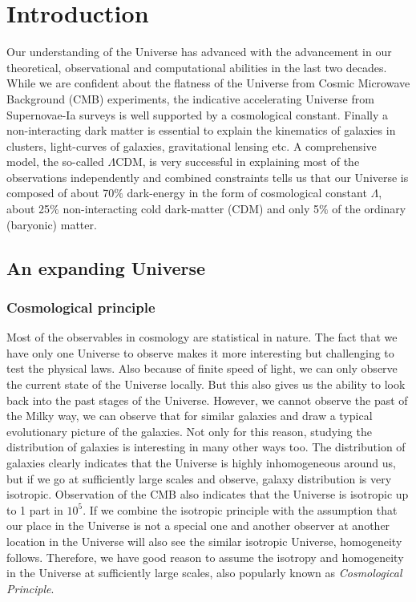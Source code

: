 \chapter{Introduction}\label{Introduction}

Our understanding of the Universe has advanced with the advancement in our 
theoretical, observational and computational abilities in the last two decades. 
While we are confident about the flatness of the Universe from Cosmic Microwave 
Background (CMB) experiments, 
the indicative accelerating Universe from Supernovae-Ia surveys is well supported
by a cosmological constant. Finally a non-interacting dark matter is essential 
to explain the kinematics of galaxies in clusters, light-curves of galaxies, 
gravitational lensing etc. A comprehensive model, the so-called $\Lambda$CDM,
is very successful in explaining most of the observations independently and 
combined constraints tells us that our Universe is composed of about 70$\%$
dark-energy in the form of cosmological constant $\Lambda$, about 25$\%$ non-interacting
cold dark-matter (CDM) and only 5$\%$ of the ordinary (baryonic) matter.  


\section{An expanding Universe}

\subsection{Cosmological principle}

Most of the observables in cosmology are statistical in nature. 
The fact that we have only one Universe to observe
makes it more interesting but challenging to test the physical laws. Also because
of finite speed of light, we can only observe the current state of the Universe locally. 
But this also gives us the ability to look back into the past stages of the Universe. 
However, we cannot observe the past of the Milky way, we can observe that for similar
galaxies and draw a typical evolutionary picture of the galaxies. Not only for this
reason, studying the distribution of galaxies is interesting in many other ways too. 
The distribution of galaxies clearly indicates that the Universe is highly 
inhomogeneous around us, but if we go at sufficiently large scales and observe, 
galaxy distribution is very isotropic. Observation of the CMB also indicates 
that the Universe is isotropic up to 1 part in $10^{5}$. 
If we combine the isotropic principle with the 
assumption that our place in the Universe is not a special one and another observer
at another location in the Universe will also see the similar isotropic Universe,
homogeneity follows. Therefore, we have good reason to assume the isotropy 
and homogeneity in the Universe at sufficiently large scales, also popularly
known as {\it Cosmological Principle}.

